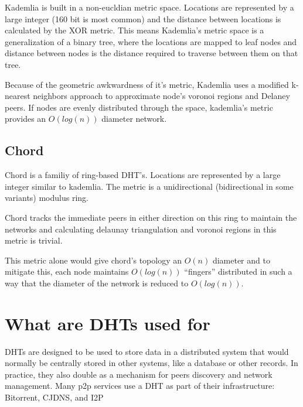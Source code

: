Kademlia is built in a non-eucldian metric space. 
Locations are represented by a large integer (160 bit is most common) and the distance between locations is calculated by the XOR metric.
This means Kademlia's metric space is a generalization of a binary tree, where the locations are mapped to leaf nodes and distance between nodes is the distance required to traverse between them on that tree.

Because of the geometric awkwardness of it's metric, Kademlia uses a modified k-nearest neighbors approach to approximate node's voronoi regions and Delaney peers.
If nodes are evenly distributed through the space, kademlia's metric provides an $O(log(n))$ diameter network.

\subsection{Chord}

Chord is a familiy of ring-based DHT's.
Locations are represented by a large integer similar to kademlia.
The metric is a unidirectional (bidirectional in some variants) modulus ring.

Chord tracks the immediate peers in either direction on this ring to maintain the networks and calculating delaunay triangulation and voronoi regions in this metric is trivial.

This metric alone would give chord's topology an $O(n)$ diameter 
and to mitigate this, each node maintains $O(log(n))$ ``fingers''
 distributed in such a way that the diameter of the network is reduced to $O(log(n))$.

\section{What are DHTs used for}

DHTs are designed to be used to store data in a distributed system that would normally be centrally stored in other systems, like a database or other records.
In practice, they also double as a mechanism for peers discovery and network management.
Many p2p services use a DHT as part of their infrastructure: Bitorrent\cite{jimenez2011kademlia}, CJDNS\cite{hodson2013meshnet}, and I2P\cite{zantout2011i2p}
